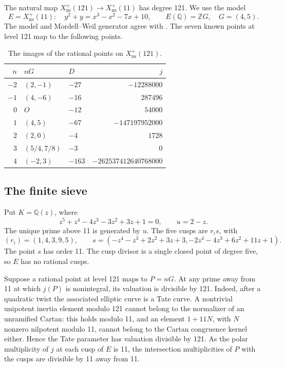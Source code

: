 \documentclass[11pt,reqno]{amsart}
\newcommand{\Q}{\mathbb Q}\newcommand{\Z}{\mathbb Z}
\newcommand{\ns}{\mathrm{ns}}\newcommand{\GL}{\operatorname{GL}}
\newcommand{\Xns}[1]{X_{\ns}^{+}(#1)}
\theoremstyle{definition}\newtheorem{definition}[theorem]{Definition}
\theoremstyle{remark}\newtheorem{remark}[theorem]{Remark}
\numberwithin{equation}{section}
\begin{document}
The natural map \(\Xns{121}\to\Xns{11}\) has degree 121.
We use the model
\begin{equation}\label{eq:E11}
 E=\Xns{11}:\quad y^2+y=x^3-x^2-7x+10,\qquad
 E(\Q)=\Z G,\quad G=(4,5).
\end{equation}
The model and Mordell--Weil generator agree with \cite{ST}.
The seven known points at level 121 map to the following points.
\begin{table}[ht]\centering
\begin{tabular}{rllr}\toprule
\(n\)&\(nG\)&\(D\)&\(j\)\\\midrule
\(-2\)&\((2,-1)\)&\(-27\)&\(-12288000\)\\
\(-1\)&\((4,-6)\)&\(-16\)&\(287496\)\\
\(0\)&\(O\)&\(-12\)&\(54000\)\\
\(1\)&\((4,5)\)&\(-67\)&\(-147197952000\)\\
\(2\)&\((2,0)\)&\(-4\)&\(1728\)\\
\(3\)&\((5/4,7/8)\)&\(-3\)&\(0\)\\
\(4\)&\((-2,3)\)&\(-163\)&\(-262537412640768000\)\\\bottomrule
\end{tabular}
\caption{The images of the rational points on \(\Xns{121}\).}\label{tab:121}
\end{table}

\subsection{The finite sieve}

Put \(K=\Q(z)\), where
\[
 z^5+z^4-4z^3-3z^2+3z+1=0,
 \qquad u=2-z.
\]
The unique prime above 11 is generated by \(u\). The five cusps are
\(r_i s\), with
\[
 (r_i)=(1,4,3,9,5),\qquad
 s=(-z^4-z^3+2z^2+3z+3,-2z^4-4z^3+6z^2+11z+1).
\]
The point \(s\) has order 11. The cusp divisor is a single closed
point of degree five, so \(E\) has no rational cusps.

Suppose a rational point at level 121 maps to \(P=nG\). At any prime
away from 11 at which \(j(P)\) is nonintegral, its valuation is divisible
by 121. Indeed, after a quadratic twist the associated elliptic curve
is a Tate curve. A nontrivial unipotent inertia element modulo 121
cannot belong to the normalizer of an unramified Cartan: this holds
modulo 11, and an element \(1+11N\), with \(N\) nonzero nilpotent
modulo 11, cannot belong to the Cartan congruence kernel either.
Hence the Tate parameter has valuation divisible by 121.
As the polar multiplicity of \(j\) at each cusp of \(E\) is 11, the
intersection multiplicities of \(P\) with the cusps are divisible by 11
away from 11.
\end{document}
